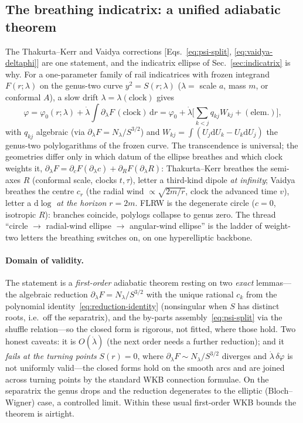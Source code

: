 \documentclass[
    aps, prd, twocolumn, superscriptaddress,
    showpacs, nofootinbib, floatfix
]{revtex4-2}
\newcommand{\dd}{\mathrm{d}}
\begin{document}
\subsection{The breathing indicatrix: a unified adiabatic theorem}
\label{sec:unified}
The Thakurta--Kerr and Vaidya corrections [Eqs.~\eqref{eq:psi-split},
\eqref{eq:vaidya-deltaphi}] are one statement, and the indicatrix ellipse of
Sec.~\ref{sec:indicatrix} is why. For a one-parameter family of rail indicatrices
with frozen integrand $F(r;\lambda)$ on the genus-two curve $y^2=S(r;\lambda)$
($\lambda=$ scale $a$, mass $m$, or conformal $A$), a slow drift
$\lambda=\lambda(\text{clock})$ gives
\begin{equation}
    \varphi=\varphi_0(r;\lambda)+\dot\lambda\!\int\!\partial_\lambda F\,
    (\text{clock})\,\dd r
    =\varphi_0+\dot\lambda\Big[\sum_{k<j} q_{kj}W_{kj}+(\text{elem.})\Big],
    \label{eq:unified}
\end{equation}
with $q_{kj}$ algebraic (via $\partial_\lambda F=N_\lambda/S^{3/2}$) and
$W_{kj}=\int(U_j\dd U_k-U_k\dd U_j)$ the genus-two polylogarithms of the frozen
curve. The transcendence is universal; the geometries differ only in which datum of
the ellipse breathes and which clock weights it,
$\partial_\lambda F=\partial_c F(\partial_\lambda c)+\partial_R F(\partial_\lambda
R)$: Thakurta--Kerr breathes the semi-axes $R$ (conformal scale, clocks $t,\tau$),
letter a third-kind dipole \emph{at infinity}; Vaidya breathes the centre $c_r$ (the
radial wind $\propto\sqrt{2m/r}$, clock the advanced time $v$), letter a $\dd\log$
\emph{at the horizon} $r=2m$. FLRW is the degenerate circle ($c=0$, isotropic $R$):
branches coincide, polylogs collapse to genus zero. The thread ``circle $\to$
radial-wind ellipse $\to$ angular-wind ellipse'' is the ladder of weight-two letters
the breathing switches on, on one hyperelliptic backbone.

\paragraph{Domain of validity.} The statement is a \emph{first-order} adiabatic
theorem resting on two \emph{exact} lemmas---the algebraic reduction
$\partial_\lambda F=N_\lambda/S^{3/2}$ with the unique rational $c_k$ from the
polynomial identity~\eqref{eq:reduction-identity} (nonsingular when $S$ has distinct
roots, i.e.\ off the separatrix), and the by-parts assembly~\eqref{eq:psi-split} via
the shuffle relation---so the closed form is rigorous, not fitted, where those hold.
Two honest caveats: it is $O(\dot\lambda)$ (the next order needs a further reduction);
and it \emph{fails at the turning points} $S(r)=0$, where
$\partial_\lambda F\sim N_\lambda/S^{3/2}$ diverges and $\dot\lambda\,\delta\varphi$ is
not uniformly valid---the closed forms hold on the smooth arcs and are joined across
turning points by the standard WKB connection formulae. On the separatrix the genus
drops and the reduction degenerates to the elliptic (Bloch--Wigner) case, a controlled
limit. Within these usual first-order WKB bounds the theorem is airtight.
\end{document}

